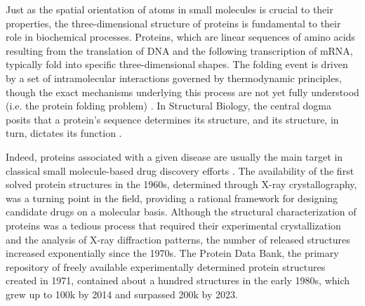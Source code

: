 Just as the spatial orientation of atoms in small molecules is crucial to their properties, the three-dimensional structure of proteins is fundamental to their role in biochemical processes. Proteins, which are linear sequences of amino acids resulting from the translation of DNA and the following transcription of mRNA, typically fold into specific three-dimensional shapes. The folding event is driven by a set of intramolecular interactions governed by thermodynamic principles, though the exact mechanisms underlying this process are not yet fully understood (i.e. the protein folding problem) \cite{anfinsen_principles_1973}. In Structural Biology, the central dogma posits that a protein's sequence determines its structure, and its structure, in turn, dictates its function \cite{maynard_smith_natural_1970, aharoni_evolvability_2005, redfern_exploring_2008}.

Indeed, proteins associated with a given disease are usually the main target in classical small molecule-based drug discovery efforts \cite{hughes_principles_2011, overington_how_2006, imming_drugs_2006}. The availability of the first solved protein structures in the 1960s, determined through X-ray crystallography, was a turning point in the field, providing a rational framework for designing candidate drugs on a molecular basis. Although the structural characterization of proteins was a tedious process that required their experimental crystallization and the analysis of X-ray diffraction patterns, the number of released structures increased exponentially since the 1970s. The Protein Data Bank\cite{berman_protein_2000}, the primary repository of freely available experimentally determined protein structures created in 1971, contained about a hundred structures in the early 1980s, which grew up to 100k by 2014 and surpassed 200k by 2023\cite{burley_rcsb_2023}.

